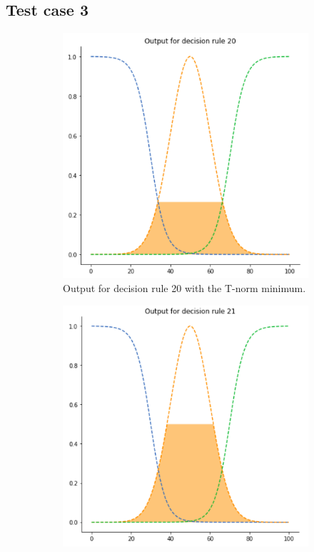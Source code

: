 \documentclass[conference]{IEEEtran}
\begin{document}
\subsection{Test case 3}
\begin{figure}[ht]
\begin{subfigure}{.5\textwidth}
  \centering
  \includegraphics[width=.8\linewidth]{figures/third/min1.png}  
  \caption{Output for decision rule 20 with the T-norm minimum.}
  \label{fig:3min1}
\end{subfigure}
\begin{subfigure}{.5\textwidth}
  \centering
  \includegraphics[width=.8\linewidth]{figures/third/min2.png}  

\end{subfigure}
\end{figure}
\end{document}
